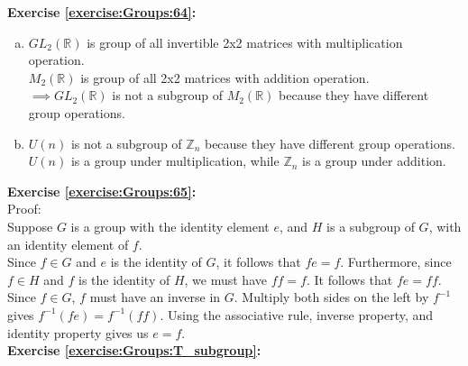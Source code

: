 \noindent\textbf{Exercise \ref{exercise:Groups:64}:}
\begin{enumerate}[(a)]
\item
$GL_2({\mathbb R})$ is group of all invertible 2x2 matrices with multiplication operation.\\
$M_2({\mathbb R})$ is group of all 2x2 matrices with addition operation.\\
$\implies GL_2({\mathbb R})$ is not a subgroup of $M_2({\mathbb R})$ because they have different group operations.

\item
$U(n)$ is not a subgroup of ${\mathbb Z}_n$ because they have different group operations.\\
$U(n)$ is a group under multiplication, while ${\mathbb Z}_n$ is a group under addition.
\end{enumerate}

\noindent\textbf{Exercise \ref{exercise:Groups:65}:}
\\
Proof:  \\
Suppose $G$ is a group with the identity element $e$, and $H$ is a subgroup of $G$, with an identity element of $f$.\\
Since $f \in G$ and $e$ is the identity of $G$, it follows that $fe=f$. Furthermore, since $f \in H$ and $f$ is the identity of $H$, we must have  $ff=f$. It follows that $fe = ff$.  Since $f \in G$, 
$f$ must have an inverse in $G$.  Multiply both sides on the left by $f^{-1}$ gives
$f^{-1}(fe) = f^{-1}(ff)$. Using the associative rule, inverse property, and identity property gives us $e=f$. 
\\

\noindent\textbf{Exercise \ref{exercise:Groups:T_subgroup}:}

